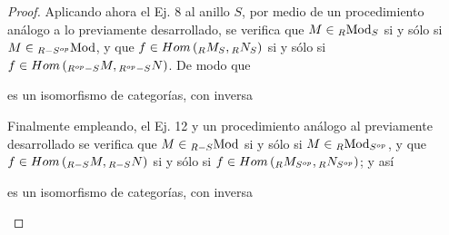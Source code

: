 \documentclass{article}
\begin{document}
\begin{enumerate}[label=\textbf{Ej \arabic*.}]
\begin{proof}
			Aplicando ahora el Ej. 8 al anillo $S$, por medio de un procedimiento análogo a lo previamente desarrollado, se verifica que $M\in\ringbimod{R}{S}{\text{Mod}}{lr}$ si y sólo si  $M\in\ringbimod{R}{\opst{S}}{\text{Mod}}{l}$, y que $f\in Hom\lrprth{\ringbimod{R}{S}{M}{lr},\ringbimod{R}{S}{N}{lr}}$ si y sólo si $f\in Hom\lrprth{\ringbimod{\opst{R}}{S}{M}{l},\ringbimod{\opst{R}}{S}{N}{l}}$. De modo que
			\begin{center}
			\end{center}
			es un isomorfismo de categorías, con inversa
			\begin{center}
			\end{center}
			Finalmente empleando, el Ej. 12 y un procedimiento análogo al previamente desarrollado se verifica que $M\in\ringbimod{R}{S}{\text{Mod}}{l}$ si y sólo si  $M\in\ringbimod{R}{\opst{S}}{\text{Mod}}{lr}$, y que $f\in Hom\lrprth{\ringbimod{R}{S}{M}{l},\ringbimod{R}{S}{N}{l}}$ si y sólo si $f\in Hom\lrprth{\ringbimod{R}{\opst{S}}{M}{lr},\ringbimod{R}{\opst{S}}{N}{lr}}$; y así
			\begin{center}
			\end{center}
			es un isomorfismo de categorías, con inversa
			\begin{center}
			\end{center}
		\end{proof}
		

\end{enumerate}
\end{document}
